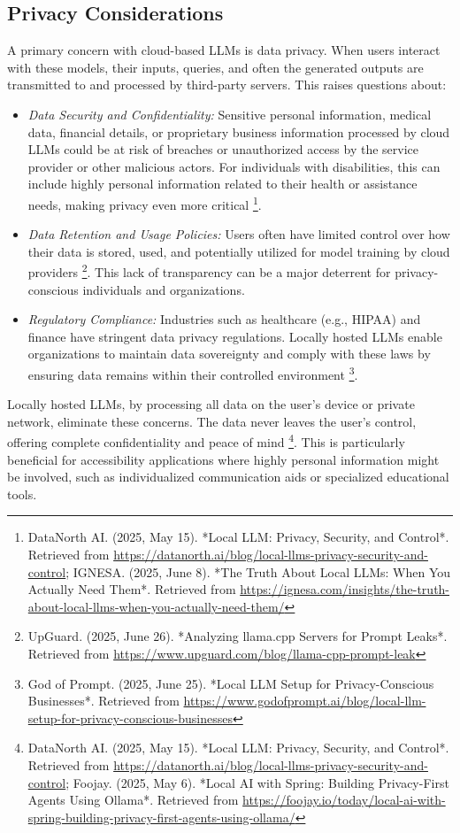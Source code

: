 \subsection{Privacy Considerations}
A primary concern with cloud-based LLMs is data privacy. When users interact with these models, their inputs, queries, and often the generated outputs are transmitted to and processed by third-party servers. This raises questions about:
\begin{itemize}
    \item \emph{Data Security and Confidentiality:} Sensitive personal information, medical data, financial details, or proprietary business information processed by cloud LLMs could be at risk of breaches or unauthorized access by the service provider or other malicious actors. For individuals with disabilities, this can include highly personal information related to their health or assistance needs, making privacy even more critical \footnote{DataNorth AI. (2025, May 15). *Local LLM: Privacy, Security, and Control*. Retrieved from \url{https://datanorth.ai/blog/local-llms-privacy-security-and-control}; IGNESA. (2025, June 8). *The Truth About Local LLMs: When You Actually Need Them*. Retrieved from \url{https://ignesa.com/insights/the-truth-about-local-llms-when-you-actually-need-them/}}.
    \item \emph{Data Retention and Usage Policies:} Users often have limited control over how their data is stored, used, and potentially utilized for model training by cloud providers \footnote{UpGuard. (2025, June 26). *Analyzing llama.cpp Servers for Prompt Leaks*. Retrieved from \url{https://www.upguard.com/blog/llama-cpp-prompt-leak}}. This lack of transparency can be a major deterrent for privacy-conscious individuals and organizations.
    \item \emph{Regulatory Compliance:} Industries such as healthcare (e.g., HIPAA) and finance have stringent data privacy regulations. Locally hosted LLMs enable organizations to maintain data sovereignty and comply with these laws by ensuring data remains within their controlled environment \footnote{God of Prompt. (2025, June 25). *Local LLM Setup for Privacy-Conscious Businesses*. Retrieved from \url{https://www.godofprompt.ai/blog/local-llm-setup-for-privacy-conscious-businesses}}.
\end{itemize}
Locally hosted LLMs, by processing all data on the user's device or private network, eliminate these concerns. The data never leaves the user's control, offering complete confidentiality and peace of mind \footnote{DataNorth AI. (2025, May 15). *Local LLM: Privacy, Security, and Control*. Retrieved from \url{https://datanorth.ai/blog/local-llms-privacy-security-and-control}; Foojay. (2025, May 6). *Local AI with Spring: Building Privacy-First Agents Using Ollama*. Retrieved from \url{https://foojay.io/today/local-ai-with-spring-building-privacy-first-agents-using-ollama/}}. This is particularly beneficial for accessibility applications where highly personal information might be involved, such as individualized communication aids or specialized educational tools.

